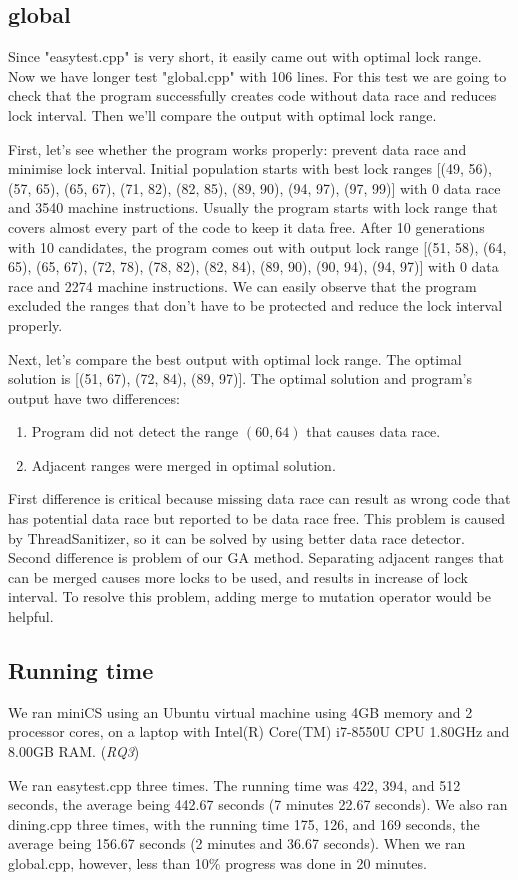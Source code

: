 \subsection{global}
Since "easytest.cpp" is very short, it easily came out with optimal lock range. Now we have longer test "global.cpp" with 106 lines. For this test we are going to check that the program successfully creates code without data race and reduces lock interval. Then we'll compare the output with optimal lock range.

First, let's see whether the program works properly: prevent data race and minimise lock interval. Initial population starts with best lock ranges [(49, 56), (57, 65), (65, 67), (71, 82), (82, 85), (89, 90), (94, 97), (97, 99)] with 0 data race and 3540 machine instructions. Usually the program starts with lock range that covers almost every part of the code to keep it data free. After 10 generations with 10 candidates, the program comes out with output lock range [(51, 58), (64, 65), (65, 67), (72, 78), (78, 82), (82, 84), (89, 90), (90, 94), (94, 97)] with 0 data race and 2274 machine instructions. We can easily observe that the program excluded the ranges that don't have to be protected and reduce the lock interval properly. 

Next, let's compare the best output with optimal lock range. The optimal solution is [(51, 67), (72, 84), (89, 97)]. The optimal solution and program's output have two differences:

\begin{enumerate}
    \item Program did not detect the range $(60, 64)$ that causes data race.
    \item Adjacent ranges were merged in optimal solution.
\end{enumerate}

First difference is critical because missing data race can result as wrong code that has potential data race but reported to be data race free. This problem is caused by ThreadSanitizer, so it can be solved by using better data race detector. Second difference is problem of our GA method. Separating adjacent ranges that can be merged causes more locks to be used, and results in increase of lock interval. To resolve this problem, adding merge to mutation operator would be helpful.

\subsection{Running time}

We ran miniCS using an Ubuntu virtual machine using 4GB memory and 2 processor cores, on a laptop with Intel(R) Core(TM) i7-8550U CPU 1.80GHz and 8.00GB RAM. (\textit{RQ3})

We ran easytest.cpp three times. The running time was 422, 394, and 512 seconds, the average being 442.67 seconds (7 minutes 22.67 seconds). We also ran dining.cpp three times, with the running time 175, 126, and 169 seconds, the average being 156.67 seconds (2 minutes and 36.67 seconds). When we ran global.cpp, however, less than 10\% progress was done in 20 minutes.
